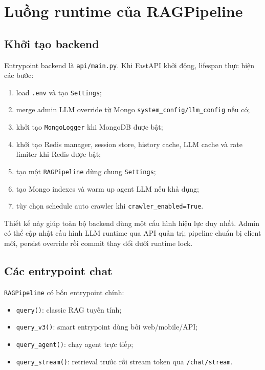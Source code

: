 \documentclass[../DoAn.tex]{subfiles}
\begin{document}
\section{Luồng runtime của RAGPipeline}

\subsection{Khởi tạo backend}

Entrypoint backend là \texttt{api/main.py}. Khi FastAPI khởi động, lifespan thực
hiện các bước:

\begin{enumerate}
    \item load \texttt{.env} và tạo \texttt{Settings};
    \item merge admin LLM override từ Mongo \texttt{system\_config/llm\_config}
    nếu có;
    \item khởi tạo \texttt{MongoLogger} khi MongoDB được bật;
    \item khởi tạo Redis manager, session store, history cache, LLM cache và
    rate limiter khi Redis được bật;
    \item tạo một \texttt{RAGPipeline} dùng chung \texttt{Settings};
    \item tạo Mongo indexes và warm up agent LLM nếu khả dụng;
    \item tùy chọn schedule auto crawler khi \texttt{crawler\_enabled=True}.
\end{enumerate}

Thiết kế này giúp toàn bộ backend dùng một cấu hình hiệu lực duy nhất. Admin có
thể cập nhật cấu hình LLM runtime qua API quản trị; pipeline chuẩn bị client mới,
persist override rồi commit thay đổi dưới runtime lock.

\subsection{Các entrypoint chat}

\texttt{RAGPipeline} có bốn entrypoint chính:

\begin{itemize}
    \item \texttt{query()}: classic RAG tuyến tính;
    \item \texttt{query\_v3()}: smart entrypoint dùng bởi web/mobile/API;
    \item \texttt{query\_agent()}: chạy agent trực tiếp;
    \item \texttt{query\_stream()}: retrieval trước rồi stream token qua
    \texttt{/chat/stream}.
\end{itemize}
\end{document}
